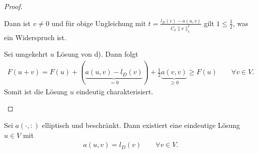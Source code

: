 \begin{proof}
\begin{enumerate}[a)]
        Dann ist $v \neq 0$ und für obige Ungleichung mit
        $t = \frac{l_D(v) - a(u, v)}{C_a \|v\|_1^2}$
        gilt $1 \le \frac{1}{2}$, was ein Widerspruch ist.

        Sei umgekehrt $u$ Lösung von d). Dann folgt
        \begin{eqnarray*}
              F(u + v)
            = F(u) + (\underbrace{a(u, v) - l_D(v)}_{= 0}) +
              \frac{1}{2} \underbrace{a(v, v)}_{\ge 0}
            \ge F(u) 
            \qquad \forall v\in V.
        \end{eqnarray*}
        Somit ist die Lösung $u$ eindeutig charakterisiert.
    \end{enumerate}
\end{proof}


\begin{Satz}
    \label{satz:3.27}
    Sei $a(\cdot, :)$ elliptisch und beschränkt. Dann existiert eine
    eindeutige Lösung $u\in V$ mit
    \begin{eqnarray*}
        a(u, v) = l_D(v) \qquad \forall v\in V.
    \end{eqnarray*}
\end{Satz}


